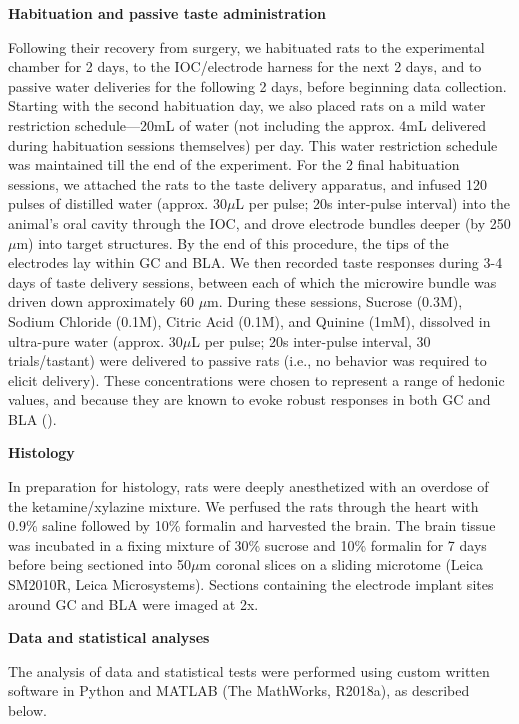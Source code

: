 \begin{refsection}
\smallskip
\noindent\textbf{Habituation and passive taste administration}\par
\noindent Following their recovery from surgery, we habituated rats to the experimental chamber for 2 days, to the IOC/electrode harness for the next 2 days, and to passive water deliveries for the following 2 days, before beginning data collection. Starting with the second habituation day, we also placed rats on a mild water restriction schedule—20mL of water (not including the approx. 4mL delivered during habituation sessions themselves) per day. This water restriction schedule was maintained till the end of the experiment. For the 2 final habituation sessions, we attached the rats to the taste delivery apparatus, and infused 120 pulses of distilled water (approx. 30$\mu$L per pulse; 20s inter-pulse interval) into the animal’s oral cavity through the IOC, and drove electrode bundles deeper (by 250 $\mu$m) into target structures. By the end of this procedure, the tips of the electrodes lay within GC and BLA. We then recorded taste responses during 3-4 days of taste delivery sessions, between each of which the microwire bundle was driven down approximately 60 $\mu$m. During these sessions, Sucrose (0.3M), Sodium Chloride (0.1M), Citric Acid (0.1M), and Quinine (1mM), dissolved in ultra-pure water (approx. 30$\mu$L per pulse; 20s inter-pulse interval, 30 trials/tastant) were delivered to passive rats (i.e., no behavior was required to elicit delivery). These concentrations were chosen to represent a range of hedonic values, and because they are known to evoke robust responses in both GC and BLA (\cite{fontanini2009a,sadacca2012a}).

\smallskip
\noindent\textbf{Histology}\par
\noindent In preparation for histology, rats were deeply anesthetized with an overdose of the ketamine/xylazine mixture. We perfused the rats through the heart with 0.9\% saline followed by 10\% formalin and harvested the brain. The brain tissue was incubated in a fixing mixture of 30\% sucrose and 10\% formalin for 7 days before being sectioned into 50$\mu$m coronal slices on a sliding microtome (Leica SM2010R, Leica Microsystems). Sections containing the electrode implant sites around GC and BLA were imaged at 2x.

\smallskip
\noindent\textbf{Data and statistical analyses}\par
\noindent The analysis of data and statistical tests were performed using custom written software in Python and MATLAB (The MathWorks, R2018a), as described below.


\end{refsection}
